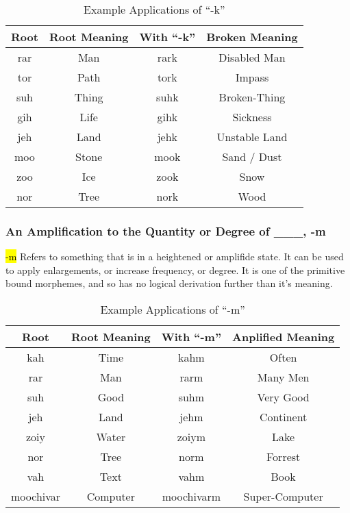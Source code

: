 \documentclass{article}
\newcommand{\hlv}[2][gray]{ {\sethlcolor{#1} \hl{#2}} }
\begin{document}
\begin{table}[H]
    \centering
    \begin{tabular}{c|c||c|c}
        Root & Root Meaning & With ``-k'' & Broken Meaning \\
        \hline
        rar & Man & rark & Disabled Man \\
        tor & Path & tork & Impass \\
        suh & Thing & suhk & Broken-Thing \\
        gih & Life & gihk & Sickness \\
        jeh & Land & jehk & Unstable Land \\
        moo & Stone & mook & Sand / Dust \\
        zoo & Ice & zook & Snow \\
        nor & Tree & nork & Wood
    \end{tabular}
    \caption{Example Applications of ``-k''}
    \label{Example Applications of ``-k''}
\end{table}

\subsubsection{An Amplification to the Quantity or Degree of \_\_\_, -m}
\hlv{-m} Refers to something that is in a heightened or amplifide state. It can be used to apply
enlargements, or increase frequency, or degree. It is one of the primitive bound morphemes, and so
has no logical derivation further than it's meaning.

\begin{table}[H]
    \centering
    \begin{tabular}{c|c||c|c}
        Root & Root Meaning & With ``-m'' & Anplified Meaning \\
        \hline
        kah & Time & kahm & Often \\
        rar & Man & rarm & Many Men \\
        suh & Good & suhm & Very Good \\
        jeh & Land & jehm & Continent \\
        zoiy & Water & zoiym & Lake \\
        nor & Tree & norm & Forrest \\
        vah & Text & vahm & Book \\
        moochivar & Computer & moochivarm & Super-Computer
    \end{tabular}
    \caption{Example Applications of ``-m''}
    \label{Example Applications of ``-m''}
\end{table}
\end{document}
